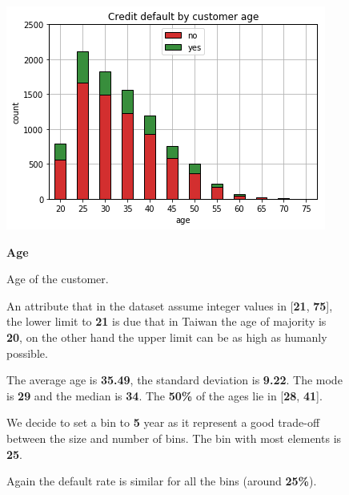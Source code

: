 \smallskip
\begin{figure}[h]
  \begin{minipage}[h]{.50\textwidth}
    \includegraphics[width=.95\textwidth]{img/ch2/age}
  \end{minipage}
  \begin{minipage}[h]{.50\textwidth}
        {\Large \textbf{Age}}
        
        Age of the customer.
        
        An attribute that in the dataset assume integer values in [\textbf{21}, \textbf{75}], the lower limit to \textbf{21} is due that in Taiwan the age of majority is \textbf{20}, on the other hand the upper limit can be as high as humanly possible.
        
        The average age is \textbf{35.49}, the standard deviation is \textbf{9.22}.
        The mode is \textbf{29} and the median is \textbf{34}.
        The \textbf{50\%} of the ages lie in [\textbf{28}, \textbf{41}].
        
        We decide to set a bin to \textbf{5} year as it represent a good trade-off between the size and number of bins. The bin with most elements is \textbf{25}.
        
        Again the default rate is similar for all the bins (around \textbf{25\%}).
  \end{minipage}
\end{figure}

\smallskip

